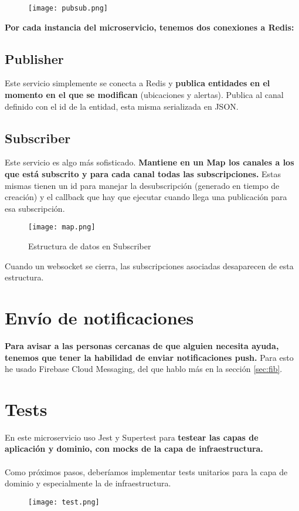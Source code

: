 \begin{figure}[H]
	\centering	
	\texttt{[image: pubsub.png]}
	\end{figure}

\textbf{Por cada instancia del microservicio, tenemos dos conexiones a Redis:}
\subsection{Publisher}

Este servicio simplemente se conecta a Redis y \textbf{publica entidades en el momento en el que se modifican} (ubicaciones y alertas).
Publica al canal definido con el id de la entidad, esta misma serializada en JSON.

\subsection{Subscriber}
Este servicio es algo más sofisticado. \textbf{Mantiene en un Map los canales a los que está subscrito y 
para cada canal todas las subscripciones.} Estas mismas tienen un id para manejar la desubscripción (generado en tiempo de creación) y 
el callback que hay que ejecutar cuando llega una publicación para esa subscripción. 
\begin{figure}[H]
	\centering	
	\texttt{[image: map.png]}
	\caption{Estructura de datos en Subscriber}
	\end{figure}
Cuando un websocket se cierra, las subscripciones asociadas desaparecen de esta estructura.
\section{Envío de notificaciones}\label{sec:fibpre}
\textbf{Para avisar a las personas cercanas de que alguien necesita ayuda, tenemos que tener la habilidad de enviar
notificaciones push.} Para esto he usado Firebase Cloud Messaging, del que hablo más en la sección \ref{sec:fib}.

\section{Tests}\label{sec:tests}
En este microservicio uso Jest y Supertest \cite{supertest} para \textbf{testear las capas de aplicación y dominio, con mocks de la capa de infraestructura.} \\ \\
Como próximos pasos, deberíamos implementar tests unitarios para la capa de dominio y especialmente la de infraestructura.
\begin{figure}[H]
	\centering	
	\texttt{[image: test.png]}
	\end{figure}

